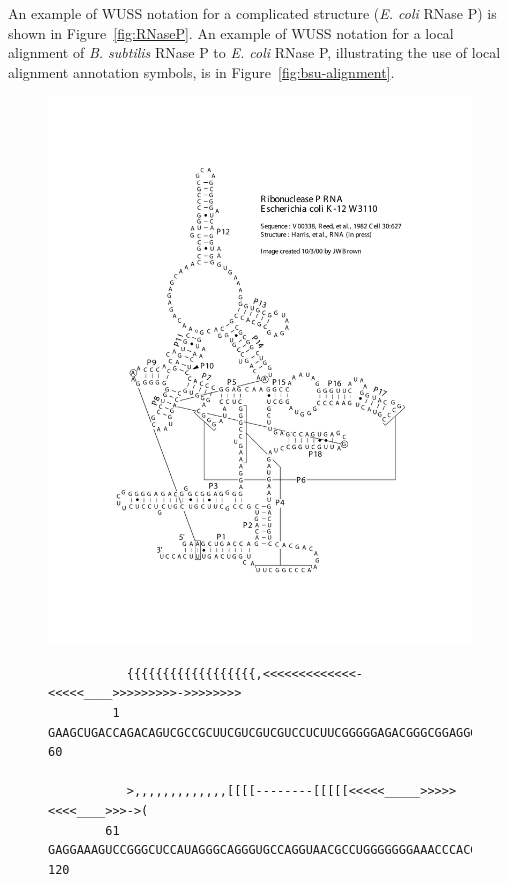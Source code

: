 An example of WUSS notation for a complicated structure
(\emph{E. coli} RNase P) is shown in Figure~\ref{fig:RNaseP}.  An
example of WUSS notation for a local  alignment of
\emph{B. subtilis} RNase P to \emph{E. coli} RNase P, illustrating the
use of local alignment annotation symbols, is in
Figure~\ref{fig:bsu-alignment}.

\begin{figure}[tp]
\begin{center}
\includegraphics[scale=0.6]{Figures/rnaseP-ecoli}
\end{center}        
\begin{center}
{\scriptsize
\begin{BVerbatim}
           {{{{{{{{{{{{{{{{{{,<<<<<<<<<<<<<-<<<<<____>>>>>>>>>->>>>>>>>
         1 GAAGCUGACCAGACAGUCGCCGCUUCGUCGUCGUCCUCUUCGGGGGAGACGGGCGGAGGG 60      

           >,,,,,,,,,,,,,[[[[--------[[[[[<<<<<_____>>>>><<<<____>>>->(
        61 GAGGAAAGUCCGGGCUCCAUAGGGCAGGGUGCCAGGUAACGCCUGGGGGGGAAACCCACG 120     


\end{BVerbatim}}
\end{center}
\end{figure}
